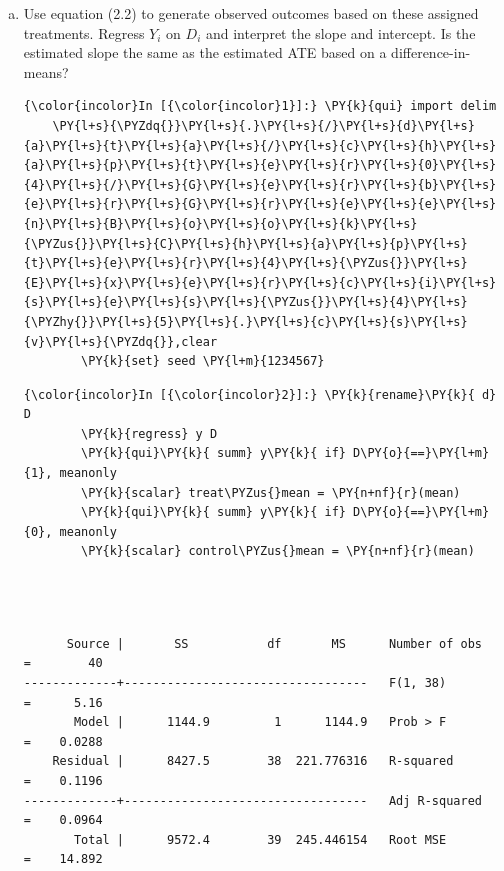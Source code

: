 \documentclass[11pt,notitlepage]{article}\usepackage[]{graphicx}\usepackage[]{color}
\makeatletter
\newenvironment{kframe}{%
 \def\at@end@of@kframe{}%
 \ifinner\ifhmode%
  \def\at@end@of@kframe{\end{minipage}}%
  \begin{minipage}{\columnwidth}%
 \fi\fi%
 \def\FrameCommand##1{\hskip\@totalleftmargin \hskip-\fboxsep
 \colorbox{shadecolor}{##1}\hskip-\fboxsep
     \hskip-\linewidth \hskip-\@totalleftmargin \hskip\columnwidth}%
 \MakeFramed {\advance\hsize-\width
   \@totalleftmargin\z@ \linewidth\hsize
   \@setminipage}}%
 {\par\unskip\endMakeFramed%
 \at@end@of@kframe}
\newenvironment{knitrout}{}{} %
\makeatother
\begin{document}
\begin{enumerate}[a)]
\item Use equation (2.2) to generate observed outcomes based on these assigned treatments.  Regress $Y_i$ on $D_i$ and interpret the slope and intercept.  Is the estimated slope the same as the estimated ATE based on a difference-in-means?
\begin{knitrout}
\color{fgcolor}\begin{kframe}
    \begin{Verbatim}[commandchars=\\\{\}]
{\color{incolor}In [{\color{incolor}1}]:} \PY{k}{qui} import delim 
	\PY{l+s}{\PYZdq{}}\PY{l+s}{.}\PY{l+s}{/}\PY{l+s}{d}\PY{l+s}{a}\PY{l+s}{t}\PY{l+s}{a}\PY{l+s}{/}\PY{l+s}{c}\PY{l+s}{h}\PY{l+s}{a}\PY{l+s}{p}\PY{l+s}{t}\PY{l+s}{e}\PY{l+s}{r}\PY{l+s}{0}\PY{l+s}{4}\PY{l+s}{/}\PY{l+s}{G}\PY{l+s}{e}\PY{l+s}{r}\PY{l+s}{b}\PY{l+s}{e}\PY{l+s}{r}\PY{l+s}{G}\PY{l+s}{r}\PY{l+s}{e}\PY{l+s}{e}\PY{l+s}{n}\PY{l+s}{B}\PY{l+s}{o}\PY{l+s}{o}\PY{l+s}{k}\PY{l+s}{\PYZus{}}\PY{l+s}{C}\PY{l+s}{h}\PY{l+s}{a}\PY{l+s}{p}\PY{l+s}{t}\PY{l+s}{e}\PY{l+s}{r}\PY{l+s}{4}\PY{l+s}{\PYZus{}}\PY{l+s}{E}\PY{l+s}{x}\PY{l+s}{e}\PY{l+s}{r}\PY{l+s}{c}\PY{l+s}{i}\PY{l+s}{s}\PY{l+s}{e}\PY{l+s}{s}\PY{l+s}{\PYZus{}}\PY{l+s}{4}\PY{l+s}{\PYZhy{}}\PY{l+s}{5}\PY{l+s}{.}\PY{l+s}{c}\PY{l+s}{s}\PY{l+s}{v}\PY{l+s}{\PYZdq{}},clear
        \PY{k}{set} seed \PY{l+m}{1234567}
\end{Verbatim}

    \begin{Verbatim}[commandchars=\\\{\}]
{\color{incolor}In [{\color{incolor}2}]:} \PY{k}{rename}\PY{k}{ d} D	
        \PY{k}{regress} y D	
        \PY{k}{qui}\PY{k}{ summ} y\PY{k}{ if} D\PY{o}{==}\PY{l+m}{1}, meanonly
        \PY{k}{scalar} treat\PYZus{}mean = \PY{n+nf}{r}(mean)
        \PY{k}{qui}\PY{k}{ summ} y\PY{k}{ if} D\PY{o}{==}\PY{l+m}{0}, meanonly
        \PY{k}{scalar} control\PYZus{}mean = \PY{n+nf}{r}(mean)
\end{Verbatim}

    \begin{Verbatim}[commandchars=\\\{\}]
    
    
    
      Source |       SS           df       MS      Number of obs   =        40
-------------+----------------------------------   F(1, 38)        =      5.16
       Model |      1144.9         1      1144.9   Prob > F        =    0.0288
    Residual |      8427.5        38  221.776316   R-squared       =    0.1196
-------------+----------------------------------   Adj R-squared   =    0.0964
       Total |      9572.4        39  245.446154   Root MSE        =    14.892


\end{Verbatim}
\end{kframe}
\end{knitrout}
\end{enumerate}
\end{document}
